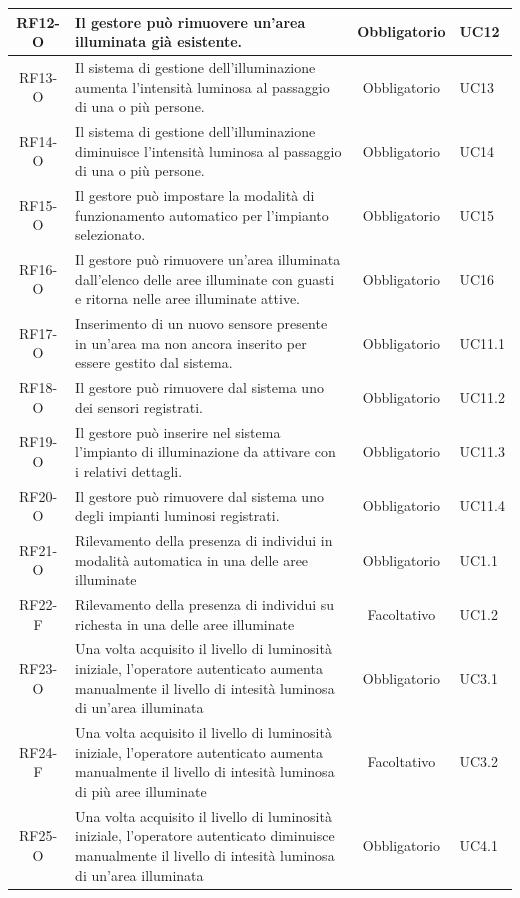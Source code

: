\documentclass[a4paper, 12pt]{article}
\begin{document}
\begin{longtable}{|c|p{7cm}|c|p{4cm}|}
    \hline
    RF12-O & Il gestore può rimuovere un'area illuminata già esistente. & Obbligatorio & UC12 \\
    \hline
    RF13-O & Il sistema di gestione dell'illuminazione aumenta l'intensità luminosa al passaggio di una o più persone. & Obbligatorio & UC13 \\
    \hline
    RF14-O & Il sistema di gestione dell'illuminazione diminuisce l'intensità luminosa al passaggio di una o più persone. & Obbligatorio & UC14 \\
    \hline
    RF15-O & Il gestore può impostare la modalità di funzionamento automatico per l'impianto selezionato. & Obbligatorio & UC15 \\
    \hline
    RF16-O & Il gestore può rimuovere un'area illuminata dall'elenco delle aree illuminate con guasti e ritorna nelle aree illuminate attive. & Obbligatorio & UC16 \\
    \hline
    RF17-O & Inserimento di un nuovo sensore presente in un'area ma non ancora inserito per essere gestito dal sistema. & Obbligatorio & UC11.1 \\
    \hline
    RF18-O & Il gestore può rimuovere dal sistema uno dei sensori registrati. & Obbligatorio & UC11.2\\
    \hline
    RF19-O & Il gestore può inserire nel sistema l'impianto di illuminazione da attivare con i relativi dettagli. & Obbligatorio & UC11.3\\
    \hline
    RF20-O & Il gestore può rimuovere dal sistema uno degli impianti luminosi registrati. & Obbligatorio & UC11.4 \\
    \hline
    RF21-O & Rilevamento della presenza di individui in modalità automatica in una delle aree illuminate & Obbligatorio & UC1.1 \\
    \hline
    RF22-F & Rilevamento della presenza di individui su richesta in una delle aree illuminate & Facoltativo & UC1.2 \\
    \hline
    RF23-O & Una volta acquisito il livello di luminosità iniziale, l'operatore autenticato aumenta manualmente il livello di intesità luminosa di un'area illuminata & Obbligatorio & UC3.1 \\
    \hline
    RF24-F & Una volta acquisito il livello di luminosità iniziale, l'operatore autenticato aumenta manualmente il livello di intesità luminosa di più aree illuminate & Facoltativo & UC3.2 \\
    \hline
    RF25-O & Una volta acquisito il livello di luminosità iniziale, l'operatore autenticato diminuisce manualmente il livello di intesità luminosa di un'area illuminata & Obbligatorio & UC4.1 \\

\end{longtable}
\end{document}
